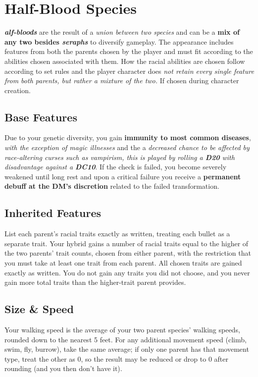 \section{Half-Blood Species} 
\textit{\textbf{alf-bloods}} are the result of a \textit{union between two species} and can be a \textbf{mix of any two besides \textit{seraphs}} to diversify gameplay. The appearance includes features from both the parents chosen by the player and must fit according to the abilities chosen associated with them. How the racial abilities are chosen follow according to set rules and the player character does \textit{not retain every single feature from both parents, but rather a mixture of the two.} If chosen during character creation.

\subsection{Base Features}
Due to your genetic diversity, you gain \textbf{immunity to most common diseases},\textit{ with the exception of magic illnesses} and the a \textit{decreased chance to be affected by race-altering curses such as vampirism, this is played by rolling a \textbf{D20} with disadvantage against a \textbf{DC10}}. If the check is failed, you become severely weakened until long rest and upon a critical failure you receive a \textbf{permanent debuff at the DM's discretion} related to the failed transformation.

\subsection{Inherited Features}
List each parent’s racial traits exactly as written, treating each bullet as a separate trait. Your hybrid gains a number of racial traits equal to the higher of the two parents’ trait counts, chosen from either parent, with the restriction that you must take at least one trait from each parent. All chosen traits are gained exactly as written. You do not gain any traits you did not choose, and you never gain more total traits than the higher-trait parent provides.

\subsection{Size \& Speed}
Your walking speed is the average of your two parent species' walking speeds, rounded down to the nearest 5 feet. For any additional movement speed (climb, swim, fly, burrow), take the same average; if only one parent has that movement type, treat the other as 0, so the result may be reduced or drop to 0 after rounding (and you then don't have it).

